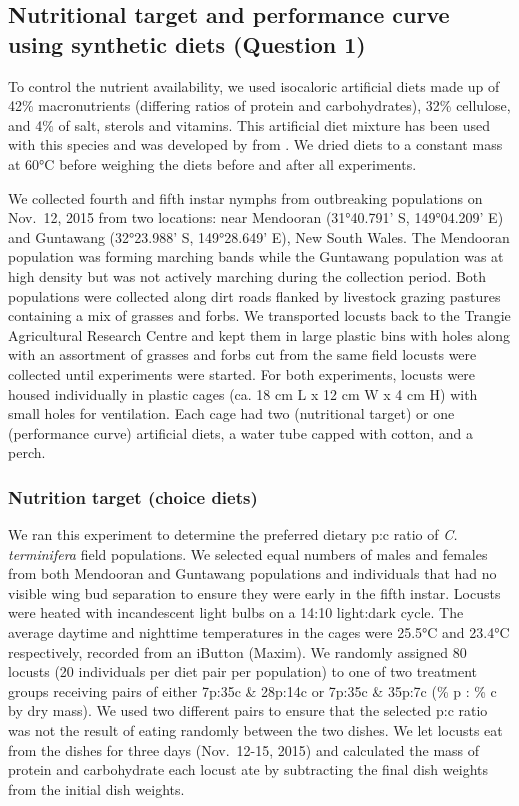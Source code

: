 \documentclass[
]{article}
\begin{document}
\subsection{Nutritional target and performance curve using synthetic
diets (Question
1)}\label{nutritional-target-and-performance-curve-using-synthetic-diets-question-1}

To control the nutrient availability, we used isocaloric artificial
diets made up of 42\% macronutrients (differing ratios of protein and
carbohydrates), 32\% cellulose, and 4\% of salt, sterols and vitamins.
This artificial diet mixture has been used with this species
\citep{clissold_regulation_2014} and was developed by
\citet{simpson_compensation_1985} from \citet{dadd_nutritional_1961}. We
dried diets to a constant mass at 60°C before weighing the diets before
and after all experiments.

We collected fourth and fifth instar nymphs from outbreaking populations
on Nov.~12, 2015 from two locations: near Mendooran (31°40.791' S,
149°04.209' E) and Guntawang (32°23.988' S, 149°28.649' E), New South
Wales. The Mendooran population was forming marching bands while the
Guntawang population was at high density but was not actively marching
during the collection period. Both populations were collected along dirt
roads flanked by livestock grazing pastures containing a mix of grasses
and forbs. We transported locusts back to the Trangie Agricultural
Research Centre and kept them in large plastic bins with holes along
with an assortment of grasses and forbs cut from the same field locusts
were collected until experiments were started. For both experiments,
locusts were housed individually in plastic cages (ca. 18 cm L x 12 cm W
x 4 cm H) with small holes for ventilation. Each cage had two
(nutritional target) or one (performance curve) artificial diets, a
water tube capped with cotton, and a perch.

\subsubsection{Nutrition target (choice
diets)}\label{nutrition-target-choice-diets}

We ran this experiment to determine the preferred dietary p:c ratio of
\emph{C. terminifera} field populations. We selected equal numbers of
males and females from both Mendooran and Guntawang populations and
individuals that had no visible wing bud separation to ensure they were
early in the fifth instar. Locusts were heated with incandescent light
bulbs on a 14:10 light:dark cycle. The average daytime and nighttime
temperatures in the cages were 25.5°C and 23.4°C respectively, recorded
from an iButton (Maxim). We randomly assigned 80 locusts (20 individuals
per diet pair per population) to one of two treatment groups receiving
pairs of either 7p:35c \& 28p:14c or 7p:35c \& 35p:7c (\% p : \% c by
dry mass). We used two different pairs to ensure that the selected p:c
ratio was not the result of eating randomly between the two dishes. We
let locusts eat from the dishes for three days (Nov.~12-15, 2015) and
calculated the mass of protein and carbohydrate each locust ate by
subtracting the final dish weights from the initial dish weights.
\end{document}
